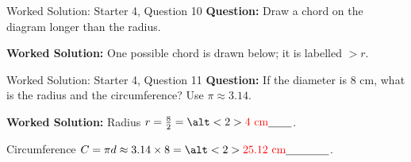 \documentclass{beamer}
\newcommand{\ablank}[1]{%
  \alt<2>{\textcolor{red}{#1}}{\underline{\phantom{#1}}}%
}
\begin{document}
\begin{frame}{Worked Solution: Starter 4, Question 10}
\small
\textbf{Question:} Draw a chord on the diagram longer than the radius.

\begin{center}
\end{center}

\textbf{Worked Solution:} One possible chord is drawn below; it is labelled \(>r\).
\end{frame}

\begin{frame}{Worked Solution: Starter 4, Question 11}
\small
\textbf{Question:} If the diameter is \(8\) cm, what is the radius and the circumference? Use \(\pi\approx3.14\).

\textbf{Worked Solution:} Radius \(r=\frac{8}{2}=\ablank{4\text{ cm}}\).

Circumference \(C=\pi d\approx3.14\times8=\ablank{25.12\text{ cm}}\).
\end{frame}
\end{document}
